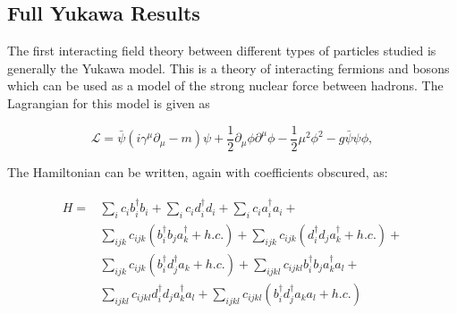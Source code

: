 \subsection{Full Yukawa Results}
\label{sec:yukawa_results}

The first interacting field theory between different types of particles studied is generally the Yukawa model.
This is a theory of interacting fermions and bosons which can be used as a model of the strong nuclear force between hadrons.
The Lagrangian for this model is given as

\begin{equation}
    \label{eq:yukawa-lagrangian}
    \mathcal{L} = \bar \psi \left(i\gamma^\mu \partial_\mu - m \right)\psi + \frac{1}{2}\partial_\mu \phi \partial^\mu \phi - \frac{1}{2}\mu^2\phi^2 - g\bar \psi \psi \phi,
\end{equation}

The Hamiltonian can be written, again with coefficients obscured, as:

\begin{align}
    \begin{split}
        H = &\sum_i c_i b_i^\dagger b_i + \sum_i c_i d_i^\dagger d_i + \sum_i c_i a_i^\dagger a_i + \\
        &\sum_{ijk}c_{ijk}\left(b_i^\dagger b_j a_k^\dagger + h.c. \right) + \sum_{ijk}c_{ijk}\left(d_i^\dagger d_j a_k^\dagger + h.c. \right) + \\
        &\sum_{ijk}c_{ijk}\left(b_i^\dagger d_j^\dagger a_k + h.c. \right) + \sum_{ijkl}c_{ijkl}b_i^\dagger b_j a_k^\dagger a_l + \\
        &\sum_{ijkl}c_{ijkl}d_i^\dagger d_j a_k^\dagger a_l + \sum_{ijkl}c_{ijkl}\left(b_i^\dagger d_j^\dagger a_k a_l + h.c. \right)
    \end{split}
\end{align}

